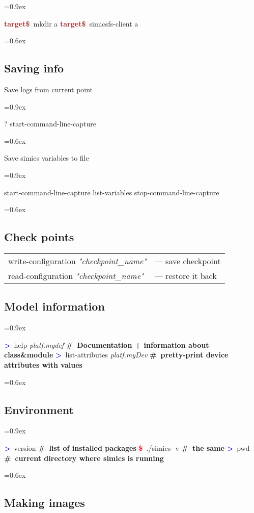\documentclass[8pt]{extarticle}
\newenvironment{code}[1][]{%
\begin{prebox}[#1]\obeylines%
\fontdimen2\font=0.9ex%
}{%
\end{prebox}%
\fontdimen2\font=0.6ex%
}
\newcommand{\cod}[1]{\colorbox{green!15}{#1}}
\newcommand{\prompt}{\textcolor{red}{\textbf{\$}\ }}
\newcommand{\tprompt}{\textcolor{brown}{\textbf{target\$}\ }}
\newcommand{\sprompt}{\textcolor{blue}{\textbf{>}\ }}
\newcommand{\cmtcommon}[1]{\textcolor{Sepia}{\textbf{#1}}}
\newcommand{\cmt}[1]{\cmtcommon{\#\ #1}}
\newcommand{\p}[1]{\textit{\large#1}}
\begin{document}
\begin{multicols*}{3}
\begin{code}[colback=blue!15]
\tprompt mkdir a
\tprompt simicsfs-client a
\end{code}

\subsection{Saving info}
Save logs from current point
\begin{code}
? start-command-line-capture
\end{code}

Save simics variables to file
\begin{code}
start-command-line-capture
list-variables
stop-command-line-capture
\end{code}

\subsection{Check points}
\begin{tabular}{ll}
            \cod{write-configuration \p{"checkpoint\_name"}} & — save
            checkpoint \\
            \cod{read-configuration \p{"checkpoint\_name"}} & — restore it back
\end{tabular}

\subsection{Model information}

\begin{code}
    \sprompt help \p{platf.mydef}  \cmt{Documentation + information about class\&module}
    \sprompt list-attributes \p{platf.myDev}  \cmt{pretty-print device attributes with values}
\end{code}

\subsection{Environment}
\begin{code}
    \sprompt version  \cmt{list of installed packages}
    \prompt ./simics -v \cmt{the same}
    \sprompt pwd \cmt{current directory where simics is running}
\end{code}

\subsection{Making images}


\end{multicols*}
\end{document}
